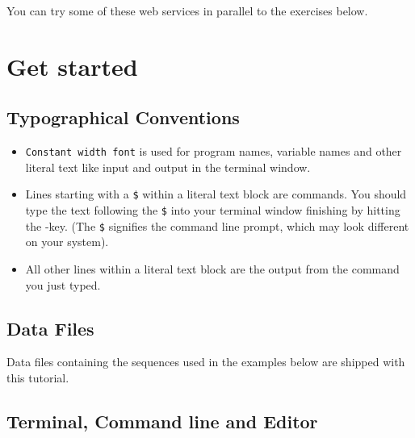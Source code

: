 \documentclass[a4paper]{article}
\newcommand{\frametitle}[1]{\subsubsection{#1}}
\begin{document}
You can try some of these web services in parallel to the exercises below.

\section{Get started}
\subsection{Typographical Conventions}
\begin{itemize}
  \item \texttt{Constant width font} is used for program names, variable
    names and other literal text like input and output in the terminal
    window.

  \item Lines starting with a \texttt{\$} within a literal text block
    are commands. You should type the text following the \texttt{\$} into
    your terminal window finishing by hitting the \Enter-key. (The
    \texttt{\$} signifies the command line prompt, which may look
    different on your system).

  \item All other lines within a literal text block are the output from
    the command you just typed.
\end{itemize}

\subsection{Data Files}
Data files containing the sequences used in the examples below are
shipped with this tutorial.

\subsection{Terminal, Command line and Editor}
\end{document}
